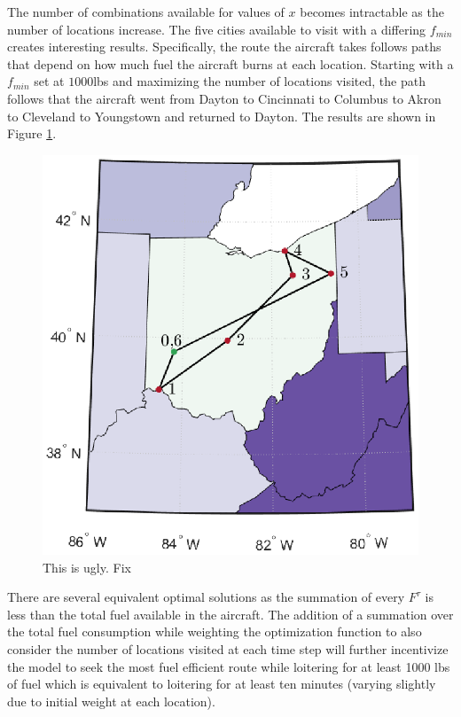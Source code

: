 The number of combinations available for values of $x$ becomes intractable as the number of locations increase. The five cities available to visit with a differing $f_{min}$ creates interesting results. Specifically, the route the aircraft takes follows paths that depend on how much fuel the aircraft burns at each location. Starting with a $f_{min}$ set at $1000$lbs and maximizing the number of locations visited, the path follows that the aircraft went from Dayton to Cincinnati to Columbus to Akron to Cleveland to Youngstown and returned to Dayton. The results are shown in Figure \ref{fig:fmin1000}.
\begin{figure}[H]
    \centering
    \includegraphics{Thesis/Method_II/fmin1000.eps}
    \caption{This is ugly. Fix}
    \label{fig:fmin1000}
\end{figure}
There are several equivalent optimal solutions as the summation of every $F^\tau$ is less than the total fuel available in the aircraft. The addition of a summation over the total fuel consumption while weighting the optimization function to also consider the number of locations visited at each time step will further incentivize the model to seek the most fuel efficient route while loitering for at least 1000 lbs of fuel which is equivalent to loitering for at least ten minutes (varying slightly due to initial weight at each location).\par
